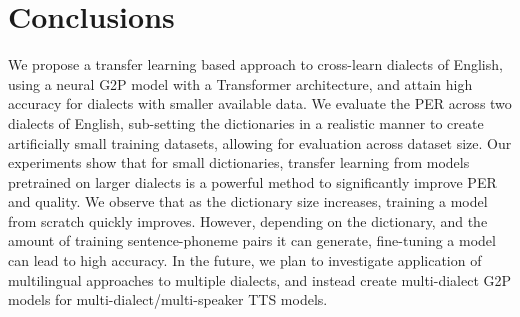 \section{Conclusions}

We propose a transfer learning based approach to cross-learn dialects of English, using a neural G2P model with a Transformer architecture, and attain high accuracy for dialects with smaller available data. We evaluate the PER across two dialects of English, sub-setting the dictionaries in a realistic manner to create artificially small training datasets, allowing for evaluation across dataset size. Our experiments show that for small dictionaries, transfer learning from models pretrained on larger dialects is a powerful method to significantly improve PER and quality. We observe that as the dictionary size increases, training a model from scratch quickly improves. However, depending on the dictionary, and the amount of training sentence-phoneme pairs it can generate, fine-tuning a model can lead to high accuracy. In the future, we plan to investigate application of multilingual approaches to multiple dialects, and instead create multi-dialect G2P models for multi-dialect/multi-speaker TTS models.